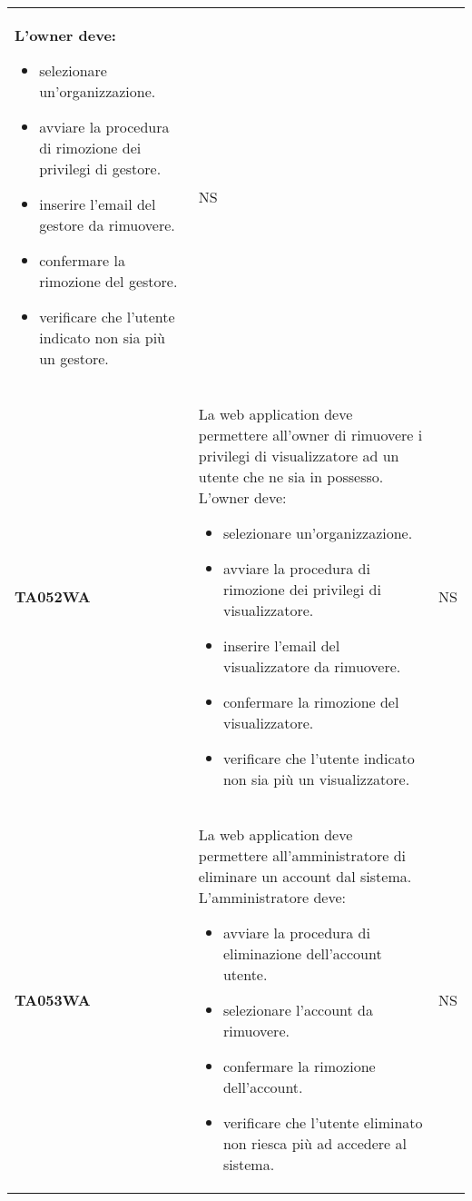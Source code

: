 \documentclass[../../piano-di-qualifica.tex]{subfiles}
\begin{document}
\begin{longtable}[H]{>{\centering\bfseries}m{3cm} >{}m{10cm} >{\centering\arraybackslash}m{3cm}}
  L'owner deve:
  \begin{itemize}
    \item selezionare un'organizzazione.
    \item avviare la procedura di rimozione dei privilegi di gestore.
    \item inserire l'email del gestore da rimuovere.
    \item confermare la rimozione del gestore.
    \item verificare che l'utente indicato non sia più un gestore.
  \end{itemize}
                    & NS                                                                                                                                                                                                                                                               \\
  TA052WA           & La web application deve permettere all'owner di rimuovere i privilegi di visualizzatore ad un utente che ne sia in possesso. \newline
  L'owner deve:
  \begin{itemize}
    \item selezionare un'organizzazione.
    \item avviare la procedura di rimozione dei privilegi di visualizzatore.
    \item inserire l'email del visualizzatore da rimuovere.
    \item confermare la rimozione del visualizzatore.
    \item verificare che l'utente indicato non sia più un visualizzatore.
  \end{itemize}
                    & NS                                                                                                                                                                                                                                                               \\
  TA053WA           & La web application deve permettere all'amministratore di eliminare un account dal sistema. \newline
  L'amministratore deve:
  \begin{itemize}
    \item avviare la procedura di eliminazione dell'account utente.
    \item selezionare l'account da rimuovere.
    \item confermare la rimozione dell'account.
    \item verificare che l'utente eliminato non riesca più ad accedere al sistema.
  \end{itemize}
                    & NS                                                                                                                                                                                                                                                               \\


\end{longtable}
\end{document}
